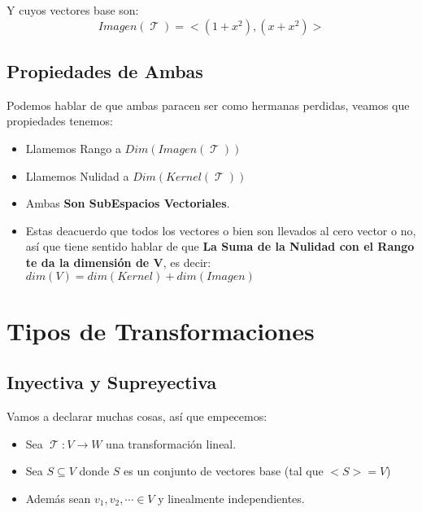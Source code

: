 \documentclass[12pt]{report}                                %
\DeclareMathOperator \LinealTransformation {\mathcal{T}}
\begin{document}
            Y cuyos vectores base son:
            \begin{equation*}
                Imagen(\LinealTransformation) = <(1+x^2) , (x+x^2)>
            \end{equation*}

    \clearpage
    \section{Propiedades de Ambas}
        Podemos hablar de que ambas paracen ser como hermanas perdidas,
        veamos que propiedades tenemos:

        \begin{itemize}
            \item Llamemos Rango a $Dim(Imagen(\LinealTransformation))$
            \item Llamemos Nulidad a $Dim(Kernel(\LinealTransformation))$
            \item Ambas \textbf{Son SubEspacios Vectoriales}.
            \item Estas deacuerdo que todos los vectores o bien son llevados al cero
            vector o no, así que tiene sentido hablar de que  \textbf{La Suma de la Nulidad
            con el Rango te da la dimensión de V}, es decir: $dim(V) = dim(Kernel)+dim(Imagen)$
        \end{itemize}


\chapter{Tipos de Transformaciones}

    \clearpage
    \section{Inyectiva y Supreyectiva}
        Vamos a declarar muchas cosas, así que empecemos:
        \begin{itemize}
            \item Sea $\LinealTransformation : V \to W $ una transformación lineal.
            \item Sea $S \subseteq V$ donde $S$ es un conjunto de vectores base (tal que $<S> = V$)
            \item Además sean $v_1, v_2, \cdots \in V$ y linealmente independientes.
        \end{itemize}
        
\end{document}

